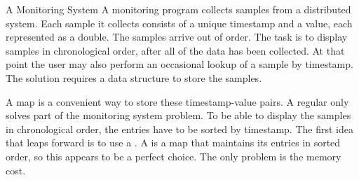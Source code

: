 







 \begin{example}{A Monitoring System}
   A monitoring program collects samples from a distributed
   system. Each sample it collects consists of a unique timestamp and a
   value, each represented as a double. The samples arrive out of
   order. The task is to display samples in chronological order, after all of
   the data has been collected. At that point the user may also perform an
   occasional lookup of a sample by timestamp. The
   solution requires a data structure to store the samples.
\end{example}

A map is a convenient way to store these timestamp-value pairs. A regular
 only solves part of the monitoring system problem. To be able
to display the samples in chronological order, the entries have to be sorted by
timestamp.
The first idea that leaps forward is to use a . A
 is a map that maintains its entries in sorted order, so this
appears to be a perfect choice. The only problem is the memory cost.

